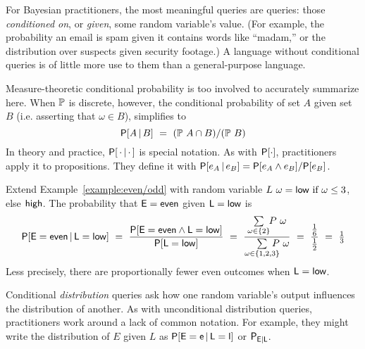 For Bayesian practitioners, the most meaningful queries are  queries: those \textit{conditioned on}, or \textit{given}, some random variable's value. (For example, the probability an email is spam given it contains words like ``madam,'' or the distribution over suspects given security footage.) A language without conditional queries is of little more use to them than a general-purpose language.

Measure-theoretic conditional probability is too involved to accurately summarize here. When $\mathbb{P}$ is discrete, however, the conditional probability of set $A$ given set $B$ (i.e. asserting that $\omega \in B$), simplifies to
\begin{equation}
	\mathsf{P}\!\left[{A \,|\, B}\right]\ =\ {\left({\mathbb{P}}\ {A \cap B}\right)} / {\left({\mathbb{P}}\ {B}\right)}
\label{eqn:discrete-conditioning}
\end{equation}
In theory and practice, $\mathsf{P}\!\left[{\,\cdot \,|\, \cdot\,}\right]$ is special notation. As with $\mathsf{P}\!\left[{\cdot}\right]$, practitioners apply it to propositions. They define it with $\mathsf{P}\!\left[{e_A \,|\, e_B}\right] = {\mathsf{P}\!\left[{e_A \wedge e_B}\right]} / {\mathsf{P}\!\left[{e_B}\right]}$.

\begin{example}
\label{example:low/high}
Extend Example~\ref{example:even/odd} with random variable ${L}\ {\omega} = \mathsf{low} \text{ if } \omega \le 3$, else $\mathsf{high}$. The probability that $\mathsf{E=even}$ given $\mathsf{L=low}$ is
\begin{equation}
	\Pspec{\objlang{E=even \given L=low}}
		\ =\ \frac{\Pspec{\objlang{E=even \wedge L=low}}}{\Pspec{\objlang{L=low}}}
		\ =\ \frac{\sum\limits_{\omega \in \set{2}} \mspace{-5mu} \app P \omega}
					{\sum\limits_{\omega \in \set{1,2,3}} \mspace{-17mu} \app P \omega}
		\ =\ \frac{\tfrac{1}{6}}{\tfrac{1}{2}}
		\ =\ \tfrac{1}{3}
\end{equation}
Less precisely, there are proportionally fewer even outcomes when $\mathsf{L=low}$.
\exampleqed
\end{example}

Conditional \textit{distribution} queries ask how one random variable's output influences the distribution of another. As with unconditional distribution queries, practitioners work around a lack of common notation. For example, they might write the distribution of $E$ given $L$ as $\mathsf{P}\!\left[{\mathsf{E=e \,|\, L=l}}\right]$ or $\mathsf{P_{E|L}}$.

